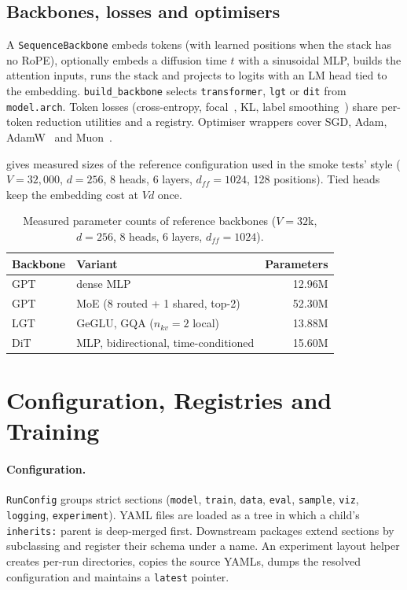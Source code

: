 \documentclass[11pt]{article}
\begin{document}
\subsection{Backbones, losses and optimisers}

A \texttt{SequenceBackbone} embeds tokens (with learned positions when the stack has no RoPE),
optionally embeds a diffusion time $t$ with a sinusoidal MLP, builds the attention inputs,
runs the stack and projects to logits with an LM head tied to the embedding.
\texttt{build\_backbone} selects \texttt{transformer}, \texttt{lgt} or \texttt{dit} from
\texttt{model.arch}. Token losses (cross-entropy, focal~\cite{lin2017focal}, KL, label
smoothing~\cite{szegedy2016inception}) share per-token reduction utilities and a registry.
Optimiser wrappers cover SGD, Adam, AdamW~\cite{loshchilov2019adamw} and Muon~\cite{jordan2024muon}.

 gives measured sizes of the reference configuration used in the smoke
tests' style ($V=32{,}000$, $d=256$, 8 heads, 6 layers, $d_{ff}=1024$, 128 positions).
Tied heads keep the embedding cost at $Vd$ once.

\begin{table}[t]
\centering
\caption{Measured parameter counts of reference backbones ($V{=}32$k, $d{=}256$, 8 heads,
6 layers, $d_{ff}{=}1024$).}
\label{tab:params}
\begin{tabular}{llr}
\toprule
Backbone & Variant & Parameters \\
\midrule
GPT & dense MLP & 12.96M \\
GPT & MoE (8 routed + 1 shared, top-2) & 52.30M \\
LGT & GeGLU, GQA ($n_{kv}=2$ local) & 13.88M \\
DiT & MLP, bidirectional, time-conditioned & 15.60M \\
\bottomrule
\end{tabular}
\end{table}

\section{Configuration, Registries and Training}

\paragraph{Configuration.} \texttt{RunConfig} groups strict sections (\texttt{model},
\texttt{train}, \texttt{data}, \texttt{eval}, \texttt{sample}, \texttt{viz}, \texttt{logging},
\texttt{experiment}). YAML files are loaded as a tree in which a child's \texttt{inherits:}
parent is deep-merged first. Downstream packages extend sections by subclassing and
register their schema under a name. An experiment layout helper creates per-run
directories, copies the source YAMLs, dumps the resolved configuration and maintains a
\texttt{latest} pointer.
\end{document}
